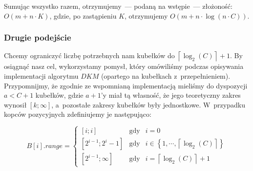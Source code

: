 Sumując wszystko razem, otrzymujemy~--- podaną na wstępie~--- złożoność: $ O \left( m + n \cdot K \right)$, gdzie, po zastąpieniu $K$, otrzymujemy $ O \left( m + n \cdot \log \left( n \cdot C \right) \right)$.

\subsubsection{Drugie podejście}

Chcemy ograniczyć liczbę potrzebnych nam kubełków do $ \left \lceil \log_{2} \left( C \right) \right \rceil + 1$. By osiągnąć nasz cel, wykorzystamy pomysł, który omówiliśmy podczas opisywania implementacji algorytmu $DKM$ (opartego na kubełkach z~przepełnieniem). Przypomnijmy, że zgodnie ze wspomnianą implementacją mieliśmy do dyspozycji $a < C + 1$ kubełków, gdzie $a + 1$'y miał tą własność, że jego teoretyczny zakres wynosił $\left[ k ; \infty \right]$, a~pozostałe zakresy kubełków były jednostkowe. W~przypadku kopców pozycyjnych zdefiniujemy je następująco:


\begin{equation}
B \left[ i \right].range = \left\{\begin{matrix}
 \left[ i; i \right ]& \textrm{gdy} & i = 0 \\ 
 \left[ 2^{i-1} ; 2^{i} - 1 \right ]& \textrm{gdy} & i \in \left\{ 1, \cdots, \left \lceil \log_{2} \left( C \right) \right \rceil \right\} \\
 \left[ 2^{i-1} ; \infty \right ]& \textrm{gdy} & i = \left \lceil \log_{2} \left( C \right) \right \rceil + 1
\end{matrix}\right.
\end{equation}

